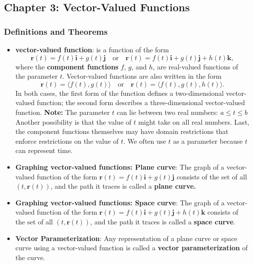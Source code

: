 \documentclass{report}
\begin{document}
    \subsection{Chapter 3: Vector-Valued Functions}
    \bigbreak \noindent 
    \subsubsection{Definitions and Theorems}
    \begin{itemize}
        \item \textbf{vector-valued function}: is a function of the form
            \[
                \mathbf{r}(t) = f(t)\mathbf{i} + g(t)\mathbf{j} \quad \text{or} \quad \mathbf{r}(t) = f(t)\mathbf{i} + g(t)\mathbf{j} + h(t)\mathbf{k},
            \]
            where the \textbf{component functions} $f$, $g$, and $h$, are real-valued functions of the parameter $t$. Vector-valued functions are also written in the form
            \[
                \mathbf{r}(t) = \langle f(t), g(t) \rangle \quad \text{or} \quad \mathbf{r}(t) = \langle f(t), g(t), h(t) \rangle.
            \]
            In both cases, the first form of the function defines a two-dimensional vector-valued function; the second form describes a three-dimensional vector-valued function.
            \bigbreak \noindent 
            \textbf{Note:} The parameter $t$ can lie between two real numbers: $a \leq t \leq b$ Another possibility is that the value of $t$ might take on all real numbers. Last, the component functions themselves may have domain restrictions that enforce restrictions on the value of $t$. We often use $t$ as a parameter because $t$ can represent time.
        \item \textbf{Graphing vector-valued functions: Plane curve}:
            The graph of a vector-valued function of the form \( \mathbf{r}(t) = f(t)\mathbf{i} + g(t)\mathbf{j} \) consists of the set of all \( (t, \mathbf{r}(t)) \), and the path it traces is called a \textbf{plane curve.}
        \item \textbf{Graphing vector-valued functions: Space curve}:
            The graph of a vector-valued function of the form \( \mathbf{r}(t) = f(t)\mathbf{i} + g(t)\mathbf{j} + h(t)\mathbf{k} \) consists of the set of all \( (t, \mathbf{r}(t)) \), and the path it traces is called a \textbf{space curve}.
        \item \textbf{Vector Parameterization}: 
            Any representation of a plane curve or space curve using a vector-valued function is called a \textbf{vector parameterization} of the curve.

\end{itemize}
\end{document}
